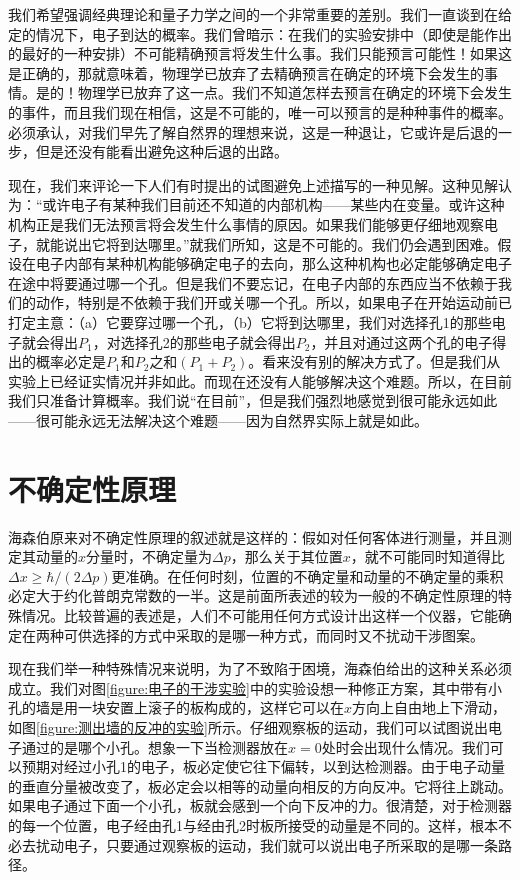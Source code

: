 我们希望强调经典理论和量子力学之间的一个非常重要的差别。我们一直谈到在给定的情况下，电子到达的概率。我们曾暗示：在我们的实验安排中（即使是能作出的最好的一种安排）不可能精确预言将发生什么事。我们只能预言可能性！如果这是正确的，那就意味着，物理学已放弃了去精确预言在确定的环境下会发生的事情。是的！物理学已放弃了这一点。我们不知道怎样去预言在确定的环境下会发生的事件，而且我们现在相信，这是不可能的，唯一可以预言的是种种事件的概率。必须承认，对我们早先了解自然界的理想来说，这是一种退让，它或许是后退的一步，但是还没有能看出避免这种后退的出路。

现在，我们来评论一下人们有时提出的试图避免上述描写的一种见解。这种见解认为：“或许电子有某种我们目前还不知道的内部机构——某些内在变量。或许这种机构正是我们无法预言将会发生什么事情的原因。如果我们能够更仔细地观察电子，就能说出它将到达哪里。”就我们所知，这是不可能的。我们仍会遇到困难。假设在电子内部有某种机构能够确定电子的去向，那么这种机构也必定能够确定电子在途中将要通过哪一个孔。但是我们不要忘记，在电子内部的东西应当不依赖于我们的动作，特别是不依赖于我们开或关哪一个孔。所以，如果电子在开始运动前已打定主意：（a）它要穿过哪一个孔，（b）它将到达哪里，我们对选择孔1的那些电子就会得出$P_1$，对选择孔2的那些电子就会得出$P_2$，并且对通过这两个孔的电子得出的概率必定是$P_1$和$P_2$之和$(P_1+P_2)$。看来没有别的解决方式了。但是我们从实验上已经证实情况并非如此。而现在还没有人能够解决这个难题。所以，在目前我们只准备计算概率。我们说“在目前”，但是我们强烈地感觉到很可能永远如此——很可能永远无法解决这个难题——因为自然界实际上就是如此。

\section{不确定性原理}

海森伯原来对不确定性原理的叙述就是这样的：假如对任何客体进行测量，并且测定其动量的$x$分量时，不确定量为$\Delta p$，那么关于其位置$x$，就不可能同时知道得比$\Delta x \geqslant \hbar/(2\Delta p)$更准确。在任何时刻，位置的不确定量和动量的不确定量的乘积必定大于约化普朗克常数的一半。这是前面所表述的较为一般的不确定性原理的特殊情况。比较普遍的表述是，人们不可能用任何方式设计出这样一个仪器，它能确定在两种可供选择的方式中采取的是哪一种方式，而同时又不扰动干涉图案。

现在我们举一种特殊情况来说明，为了不致陷于困境，海森伯给出的这种关系必须成立。我们对图\ref{figure:电子的干涉实验}中的实验设想一种修正方案，其中带有小孔的墙是用一块安置上滚子的板构成的，这样它可以在$x$方向上自由地上下滑动，如图\ref{figure:测出墙的反冲的实验}所示。仔细观察板的运动，我们可以试图说出电子通过的是哪个小孔。想象一下当检测器放在$x=0$处时会出现什么情况。我们可以预期对经过小孔1的电子，板必定使它往下偏转，以到达检测器。由于电子动量的垂直分量被改变了，板必定会以相等的动量向相反的方向反冲。它将往上跳动。如果电子通过下面一个小孔，板就会感到一个向下反冲的力。很清楚，对于检测器的每一个位置，电子经由孔1与经由孔2时板所接受的动量是不同的。这样，根本不必去扰动电子，只要通过观察板的运动，我们就可以说出电子所采取的是哪一条路径。

